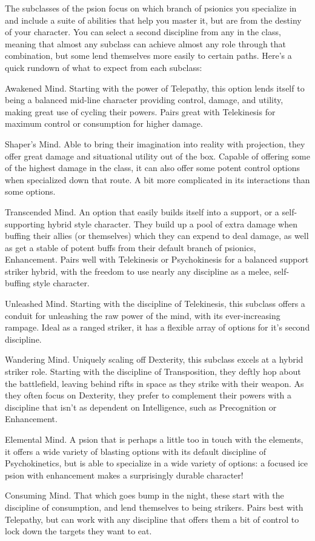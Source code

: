 \documentclass[11pt,twoside,openany]{book}  %
\begin{document}
The subclasses of the psion focus on which branch of psionics you specialize in and include a suite of abilities that help you master it, but are from the destiny of your character. You can select a second discipline from any in the class, meaning that almost any subclass can achieve almost any role through that combination, but some lend themselves more easily to certain paths. Here’s a quick rundown of what to expect from each subclass:
\begin{fiveitemize}
	\item Awakened Mind. Starting with the power of Telepathy, this option lends itself to being a balanced mid-line character providing control, damage, and utility, making great use of cycling their powers. Pairs great with Telekinesis for maximum control or consumption for higher damage.
	\item Shaper’s Mind. Able to bring their imagination into reality with projection, they offer great damage and situational utility out of the box. Capable of offering some of the highest damage in the class, it can also offer some potent control options when specialized down that route. A bit more complicated in its interactions than some options.
	\item Transcended Mind. An option that easily builds itself into a support, or a self-supporting hybrid style character. They build up a pool of extra damage when buffing their allies (or themselves) which they can expend to deal damage, as well as get a stable of potent buffs from their default branch of psionics, Enhancement. Pairs well with Telekinesis or Psychokinesis for a balanced support striker hybrid, with the freedom to use nearly any discipline as a melee, self-buffing style character.
	\item Unleashed Mind. Starting with the discipline of Telekinesis, this subclass offers a conduit for unleashing the raw power of the mind, with its ever-increasing rampage. Ideal as a ranged striker, it has a flexible array of options for it’s second discipline.
	\item Wandering Mind. Uniquely scaling off Dexterity, this subclass excels at a hybrid striker role. Starting with the discipline of Transposition, they deftly hop about the battlefield, leaving behind rifts in space as they strike with their weapon. As they often focus on Dexterity, they prefer to complement their powers with a discipline that isn’t as dependent on Intelligence, such as Precognition or Enhancement.
	\item Elemental Mind. A psion that is perhaps a little too in touch with the elements, it offers a wide variety of blasting options with its default discipline of Psychokinetics, but is able to specialize in a wide variety of options: a focused ice psion with enhancement makes a surprisingly durable character!
	\item Consuming Mind. That which goes bump in the night, these start with the discipline of consumption, and lend themselves to being strikers. Pairs best with Telepathy, but can work with any discipline that offers them a bit of control to lock down the targets they want to eat.
\end{fiveitemize}
\end{document}
